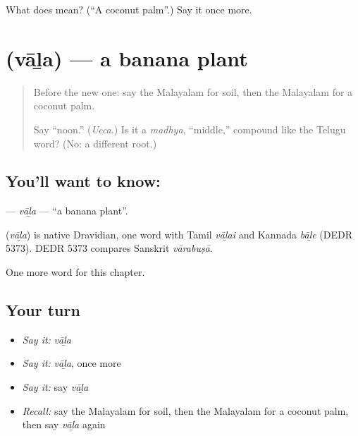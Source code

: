 \begin{tcolorbox}[breakable,colback=teal!4,colframe=teal!35!black,title={Before you move on}]
What does  mean? (\textquotedblleft{}A coconut palm\textquotedblright{}.) Say it once more.
\end{tcolorbox}
\section[\texorpdfstring{\ml{വാഴ} (vāḻa)}{വാഴ (vāḻa)}]{ (vāḻa) — a banana plant}

\label{lesson:ML-C161-vala2}



\begin{quote}
Before the new one: say the Malayalam for soil, then the Malayalam for a coconut palm.

Say \textquotedblleft{}noon.\textquotedblright{} (\emph{Ucca}.) Is it a \emph{madhya}, \textquotedblleft{}middle,\textquotedblright{} compound like the Telugu word? (No: a different root.)
\end{quote}

\subsection*{You'll want to know: }
\textbf{} — \emph{vāḻa} — \textquotedblleft{}a banana plant\textquotedblright{}.

\begin{cousinweb}
\textbf{} (\emph{vāḻa}) is native Dravidian, one word with Tamil \emph{vāḻai} and Kannada \emph{bāḻe} (DEDR 5373). DEDR 5373 compares Sanskrit \emph{vārabuṣā}.
\end{cousinweb}

\begin{grammarlens}[title={What you've built}]
One more word for this chapter.
\end{grammarlens}

\subsection*{Your turn}
\begin{itemize}
\raggedright
  \item \emph{Say it:} \emph{vāḻa}
  \item \emph{Say it:} \emph{vāḻa}, once more
  \item \emph{Say it:} say \emph{vāḻa}
  \item \emph{Recall:} say the Malayalam for soil, then the Malayalam for a coconut palm, then say \emph{vāḻa} again
\end{itemize}

